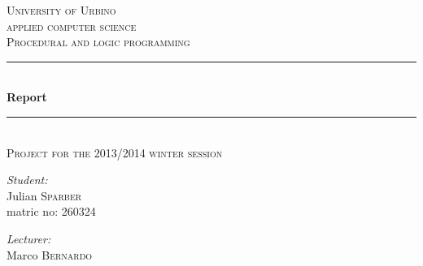 \documentclass[11pt, a4paper, titlepage, block]{article}
\begin{document}
\begin{titlepage}

\newcommand{\HRule}{\rule{\linewidth}{0.5mm}} %

\center %
 

\textsc{\LARGE University of Urbino}\\[1.5cm] %
\textsc{\Large applied computer science}\\[0.5cm] %
\textsc{\large Procedural and logic programming}\\[0.5cm] %



\HRule \\[0.4cm]
{ \huge \bfseries Report}\\[0.2cm] %
\HRule \\[0.4cm]
\textsc{\large Project for the 2013/2014 winter session}
\\[0.5cm]

\begin{minipage}{\textwidth}
\begin{flushleft}
\emph{Student:}\\
Julian \textsc{Sparber}\\ %
matric no: 260324
\end{flushleft}
\end{minipage}

\begin{minipage}{\textwidth}
\begin{flushright}
\emph{Lecturer:} \\
Marco \textsc{Bernardo} %
\end{flushright}
\end{minipage}\\[11cm]


\end{titlepage}
\end{document}
